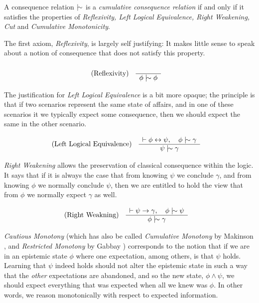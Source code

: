 \begin{definition}
  \label{definition:cumulative-consequence-relation} A consequence relation $\twiddle$ is a \emph{cumulative consequence relation} if and
  only if it satisfies the properties of \emph{Reflexivity, Left Logical Equivalence, Right Weakening, Cut} and \emph{Cumulative
  Monotonicity}.
\end{definition}

The first axiom, \textit{Reflexivity}, is largely self justifying: It makes little sense to speak about a notion of consequence that does not
satisfy this property.

\begin{align}
  \label{postulate:ref}\inferLeft{Reflexivity}{}{\phi \twiddle \phi}
\end{align}

The justification for \textit{Left Logical Equivalence} is a bit more opaque; the principle is that if two scenarios represent the same
state of affairs, and in one of these scenarios it we typically expect some consequence, then we should expect the same in the other
scenario.

\begin{align}
  \label{postulate:lle}\inferLeft{Left Logical Equivalence}{\vdash \phi \leftrightarrow \psi, \quad \phi \twiddle \gamma}{\psi \twiddle \gamma}
\end{align}

\textit{Right Weakening} allows the preservation of classical consequence within the logic. It says that if it is always the case that from knowing
$\psi$ we conclude $\gamma$, and from knowing $\phi$ we normally conclude $\psi$, then we are entitled to hold the view that from $\phi$ we normally
expect $\gamma$ as well.

\begin{align}
  \label{postulate:rw}\inferLeft{Right Weakning}{\vdash \psi \rightarrow \gamma, \quad \phi \twiddle \psi}{\phi \twiddle \gamma}
\end{align}

\textit{Cautious Monotony} (which has also be called \textit{Cumulative Monotony} by Makinson \cite{makinson2003bridges}, and \textit{Restricted
Monotony} by Gabbay \cite{gabbay1985theoreticalFoundations}) corresponds to the notion that if we are in an epistemic state $\phi$ where one
expectation, among others, is that $\psi$ holds. Learning that $\psi$ indeed holds should not alter the epistemic state in such a way that the
\textit{other} expectations are abandoned, and so the new state, $\phi \land \psi$, we should expect everything that was expected when all we
knew was $\phi$. In other words, we reason monotonically with respect to expected information.

